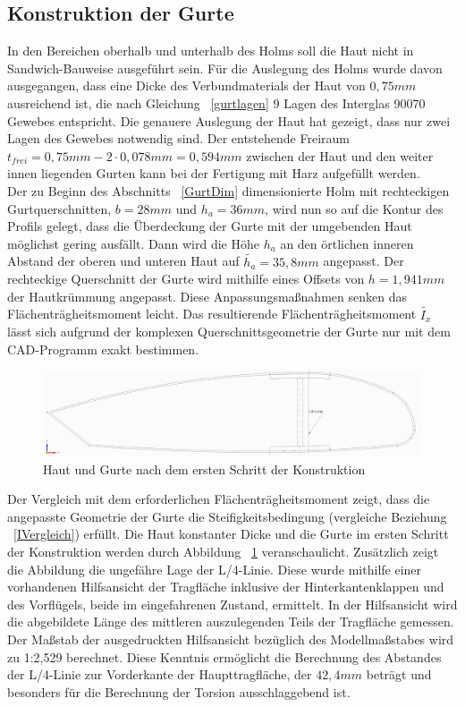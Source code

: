 \subsection{Konstruktion der Gurte}
\label{GurtKonstrukt}
\noindent In den Bereichen oberhalb und unterhalb des Holms soll die Haut nicht in Sandwich-Bauweise ausgeführt sein. Für die Auslegung des Holms wurde davon ausgegangen, dass eine Dicke des Verbundmaterials der Haut von $ 0,75mm $ ausreichend ist, die nach Gleichung ~\ref{gurtlagen} 9 Lagen des Interglas 90070 Gewebes entspricht. Die genauere Auslegung der Haut hat gezeigt, dass nur zwei Lagen des Gewebes notwendig sind. Der entstehende Freiraum $t_{frei}= 0,75mm-2\cdot 0,078mm=0,594mm $ zwischen der Haut und den weiter innen liegenden Gurten kann bei der Fertigung mit Harz aufgefüllt werden.\\
\noindent Der zu Beginn des Abschnitts ~\ref{GurtDim} dimensionierte Holm mit rechteckigen Gurtquerschnitten, $ b=28mm $ und $ h_{a}=36mm $, wird nun so auf die Kontur des Profils gelegt, dass die Überdeckung der Gurte mit der umgebenden Haut möglichst gering ausfällt. Dann wird die Höhe $ h_{a} $ an den örtlichen inneren Abstand der oberen und unteren Haut auf $\tilde{h_{a}}=35,8mm $ angepasst. Der rechteckige Querschnitt der Gurte wird mithilfe eines Offsets von $ {h}=1,941mm $ der Hautkrümmung angepasst. Diese Anpassungsmaßnahmen senken das Flächenträgheitsmoment leicht. Das resultierende Flächenträgheitsmoment $ \tilde{I_{x}} $ lässt sich aufgrund der komplexen Querschnittsgeometrie der Gurte nur mit dem CAD-Programm exakt bestimmen. 
\begin{figure}[h]
	\includegraphics[width=1.0\textwidth]{Bilder/Kontur.jpg}
	\caption{Haut und Gurte nach dem ersten Schritt der Konstruktion}
	\label{fig: Kontur}
\end{figure} 
Der Vergleich mit dem erforderlichen Flächenträgheitsmoment zeigt, dass die angepasste Geometrie der Gurte die Steifigkeitsbedingung (vergleiche Beziehung ~\ref{IVergleich}) erfüllt. Die Haut konstanter Dicke und die Gurte im ersten Schritt der Konstruktion werden durch Abbildung ~\ref{fig: Kontur} veranschaulicht. Zusätzlich zeigt die Abbildung die ungefähre Lage der L/4-Linie. Diese wurde mithilfe einer vorhandenen Hilfsansicht der Tragfläche inklusive der Hinterkantenklappen und des Vorflügels, beide im eingefahrenen Zustand, ermittelt. In der Hilfsansicht wird die abgebildete Länge des mittleren auszulegenden Teils der Tragfläche gemessen. Der Maßstab der ausgedruckten Hilfsansicht bezüglich des Modellmaßstabes wird zu 1:2,529 berechnet. Diese Kenntnis ermöglicht die Berechnung des Abstandes der L/4-Linie zur Vorderkante der Haupttragfläche, der $ 42,4mm $ beträgt und besonders für die Berechnung der Torsion ausschlaggebend ist.\\

